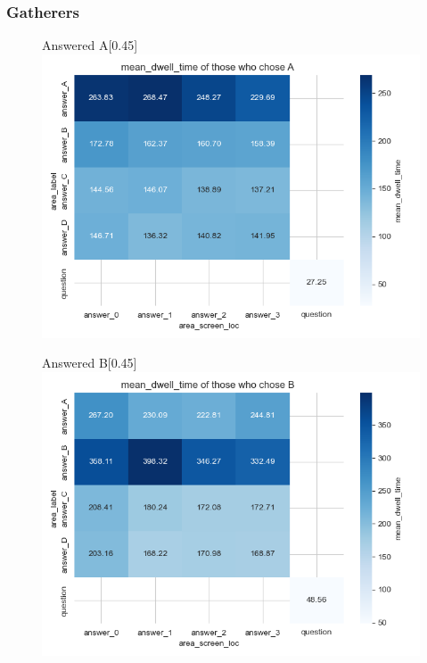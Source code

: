 \documentclass{article}
\begin{document}
\subsubsection{Gatherers}

\begin{figure}[H]
  \centering
  \begin{subcaptionbox}{Answered A\label{fig:A_dt_g}}[0.45\textwidth]
    {\centering\includegraphics[width=\linewidth]{plots/matrix_plots/matrix_mean_dwell_time_A_gatherers.png}}
  \end{subcaptionbox}
  \hfill
  \begin{subcaptionbox}{Answered B\label{fig:B_dt_g}}[0.45\textwidth]
    {\centering\includegraphics[width=\linewidth]{plots/matrix_plots/matrix_mean_dwell_time_B_gatherers.png}}
  \end{subcaptionbox}
  

\end{figure}
\end{document}
